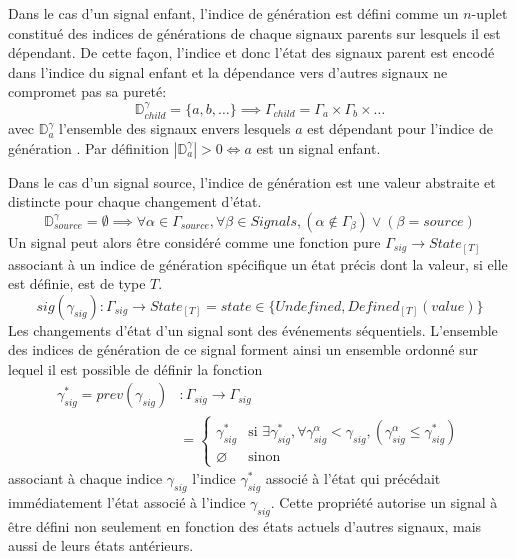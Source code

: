 	Dans le cas d'un signal enfant, l'indice de génération est défini comme un $n$-uplet constitué des indices de générations de chaque signaux parents sur lesquels il est dépendant. De cette façon, l'indice et donc l'état des signaux parent est encodé dans l'indice du signal enfant et la dépendance vers d'autres signaux ne compromet pas sa pureté:
	\[
		\mathbb{D}^\gamma_{child} = \{ a, b, \dots \} \implies \Gamma_{child} = \Gamma_a \times \Gamma_b \times \dots
	\]
	avec $\mathbb{D}^\gamma_{a}$ l'ensemble des signaux envers lesquels $a$ est dépendant pour l'indice de génération \gamma. Par définition $|\mathbb{D}^\gamma_{a}| > 0 \iff a$ est un signal enfant.
	
	Dans le cas d'un signal source, l'indice de génération est une valeur abstraite et distincte pour chaque changement d'état.
	\[
		\mathbb{D}^\gamma_{source} = \emptyset \implies \forall \alpha \in \Gamma_{source}, \forall \beta \in Signals, (\alpha \notin \Gamma_\beta) \lor (\beta = source)
	\]
	Un signal peut alors être considéré comme une fonction pure $\Gamma_{sig} \to State_{[T]}$ associant à un indice de génération spécifique un état précis dont la valeur, si elle est définie, est de type $T$.
	\[
		sig(\gamma_{sig})\colon \Gamma_{sig} \to State_{[T]} = state \in \{ Undefined, Defined_{[T]}(value) \}
	\]
	Les changements d'état d'un signal sont des événements séquentiels. L'ensemble des indices de génération de ce signal forment ainsi un ensemble ordonné sur lequel il est possible de définir la fonction
	\begin{align*}
		\gamma^*_{sig} = prev(\gamma_{sig}) &\colon \Gamma_{sig} \to \Gamma_{sig}\\
		& = \begin{cases}
			\gamma^*_{sig} & \text{si }
				 \exists \gamma^*_{sig}, \forall \gamma^\alpha_{sig} < \gamma_{sig}, (\gamma^\alpha_{sig} \leq \gamma^*_{sig})\\
			\varnothing & \text{sinon}
		\end{cases}
	\end{align*}
	associant à chaque indice $\gamma_{sig}$ l'indice $\gamma^*_{sig}$ associé à l'état qui précédait immédiatement l'état associé à l'indice $\gamma_{sig}$. Cette propriété autorise un signal à être défini non seulement en fonction des états actuels d'autres signaux, mais aussi de leurs états antérieurs.
	
